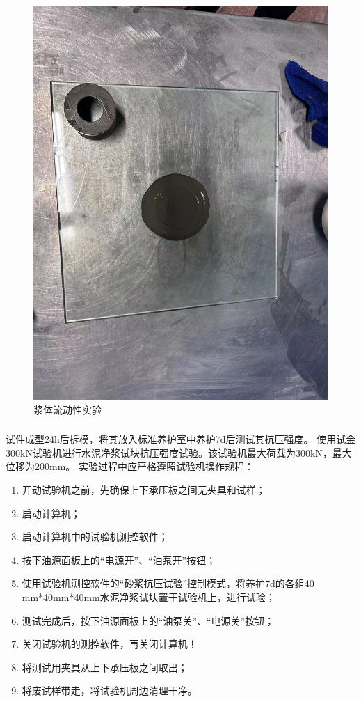 \begin{figure}
    \centering
    \caption{浆体流动性实验}
    \includegraphics[width = 0.6 \linewidth]{figures/exp1/mobility.png}
\end{figure}

\subsubsection{}
试件成型24h后拆模，将其放入标准养护室中养护7d后测试其抗压强度。
使用试金300kN试验机进行水泥净浆试块抗压强度试验。该试验机最大荷载为300kN，最大位移为200mm。
实验过程中应严格遵照试验机操作规程：
\begin{enumerate}[wide, labelwidth=!, labelindent=0pt]
    \item 开动试验机之前，先确保上下承压板之间无夹具和试样；
    \item 启动计算机；
    \item 启动计算机中的试验机测控软件；
    \item 按下油源面板上的“电源开”、“油泵开”按钮；
    \item 使用试验机测控软件的“砂浆抗压试验”控制模式，将养护7d的各组40 mm*40mm*40mm水泥净浆试块置于试验机上，进行试验；
    \item 测试完成后，按下油源面板上的“油泵关”、“电源关”按钮；
    \item 关闭试验机的测控软件，再关闭计算机！
    \item 将测试用夹具从上下承压板之间取出；
    \item 将废试样带走，将试验机周边清理干净。
\end{enumerate}

